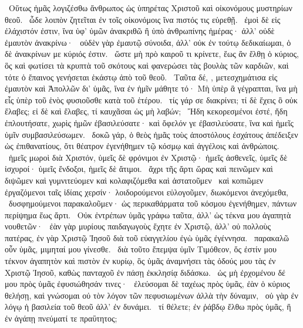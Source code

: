 ~Οὕτως ἡμᾶς λογιζέσθω ἄνθρωπος ὡς ὑπηρέτας Χριστοῦ καὶ οἰκονόμους μυστηρίων θεοῦ.
~ὧδε λοιπὸν ζητεῖται ἐν τοῖς οἰκονόμοις ἵνα πιστός τις εὑρεθῇ.
~ἐμοὶ δὲ εἰς ἐλάχιστόν ἐστιν, ἵνα ὑφ’ ὑμῶν ἀνακριθῶ ἢ ὑπὸ ἀνθρωπίνης ἡμέρας· ἀλλ’ οὐδὲ ἐμαυτὸν ἀνακρίνω·
~οὐδὲν γὰρ ἐμαυτῷ σύνοιδα, ἀλλ’ οὐκ ἐν τούτῳ δεδικαίωμαι, ὁ δὲ ἀνακρίνων με κύριός ἐστιν.
~ὥστε μὴ πρὸ καιροῦ τι κρίνετε, ἕως ἂν ἔλθῃ ὁ κύριος, ὃς καὶ φωτίσει τὰ κρυπτὰ τοῦ σκότους καὶ φανερώσει τὰς βουλὰς τῶν καρδιῶν, καὶ τότε ὁ ἔπαινος γενήσεται ἑκάστῳ ἀπὸ τοῦ θεοῦ.
~Ταῦτα δέ, , μετεσχημάτισα εἰς ἐμαυτὸν καὶ Ἀπολλῶν δι’ ὑμᾶς, ἵνα ἐν ἡμῖν μάθητε τό· Μὴ ὑπὲρ ἃ γέγραπται, ἵνα μὴ εἷς ὑπὲρ τοῦ ἑνὸς φυσιοῦσθε κατὰ τοῦ ἑτέρου.
~τίς γάρ σε διακρίνει; τί δὲ ἔχεις ὃ οὐκ ἔλαβες; εἰ δὲ καὶ ἔλαβες, τί καυχᾶσαι ὡς μὴ λαβών;
~Ἤδη κεκορεσμένοι ἐστέ, ἤδη ἐπλουτήσατε, χωρὶς ἡμῶν ἐβασιλεύσατε· καὶ ὄφελόν γε ἐβασιλεύσατε, ἵνα καὶ ἡμεῖς ὑμῖν συμβασιλεύσωμεν.
~δοκῶ γάρ, ὁ θεὸς ἡμᾶς τοὺς ἀποστόλους ἐσχάτους ἀπέδειξεν ὡς ἐπιθανατίους, ὅτι θέατρον ἐγενήθημεν τῷ κόσμῳ καὶ ἀγγέλοις καὶ ἀνθρώποις.
~ἡμεῖς μωροὶ διὰ Χριστόν, ὑμεῖς δὲ φρόνιμοι ἐν Χριστῷ· ἡμεῖς ἀσθενεῖς, ὑμεῖς δὲ ἰσχυροί· ὑμεῖς ἔνδοξοι, ἡμεῖς δὲ ἄτιμοι.
~ἄχρι τῆς ἄρτι ὥρας καὶ πεινῶμεν καὶ διψῶμεν καὶ γυμνιτεύομεν καὶ κολαφιζόμεθα καὶ ἀστατοῦμεν
~καὶ κοπιῶμεν ἐργαζόμενοι ταῖς ἰδίαις χερσίν· λοιδορούμενοι εὐλογοῦμεν, διωκόμενοι ἀνεχόμεθα,
~δυσφημούμενοι παρακαλοῦμεν· ὡς περικαθάρματα τοῦ κόσμου ἐγενήθημεν, πάντων περίψημα ἕως ἄρτι.
~Οὐκ ἐντρέπων ὑμᾶς γράφω ταῦτα, ἀλλ’ ὡς τέκνα μου ἀγαπητὰ νουθετῶν·
~ἐὰν γὰρ μυρίους παιδαγωγοὺς ἔχητε ἐν Χριστῷ, ἀλλ’ οὐ πολλοὺς πατέρας, ἐν γὰρ Χριστῷ Ἰησοῦ διὰ τοῦ εὐαγγελίου ἐγὼ ὑμᾶς ἐγέννησα.
~παρακαλῶ οὖν ὑμᾶς, μιμηταί μου γίνεσθε.
~διὰ τοῦτο ἔπεμψα ὑμῖν Τιμόθεον, ὅς ἐστίν μου τέκνον ἀγαπητὸν καὶ πιστὸν ἐν κυρίῳ, ὃς ὑμᾶς ἀναμνήσει τὰς ὁδούς μου τὰς ἐν Χριστῷ Ἰησοῦ, καθὼς πανταχοῦ ἐν πάσῃ ἐκκλησίᾳ διδάσκω.
~ὡς μὴ ἐρχομένου δέ μου πρὸς ὑμᾶς ἐφυσιώθησάν τινες·
~ἐλεύσομαι δὲ ταχέως πρὸς ὑμᾶς, ἐὰν ὁ κύριος θελήσῃ, καὶ γνώσομαι οὐ τὸν λόγον τῶν πεφυσιωμένων ἀλλὰ τὴν δύναμιν,
~οὐ γὰρ ἐν λόγῳ ἡ βασιλεία τοῦ θεοῦ ἀλλ’ ἐν δυνάμει.
~τί θέλετε; ἐν ῥάβδῳ ἔλθω πρὸς ὑμᾶς, ἢ ἐν ἀγάπῃ πνεύματί τε πραΰτητος;

